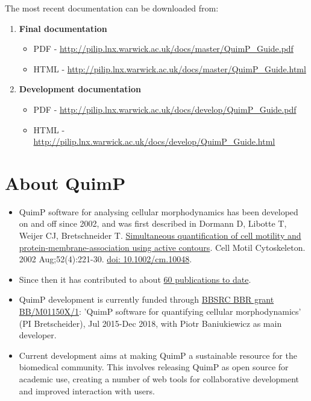 \documentclass[a4paper,12pt]{article}
\begin{document}
The most recent documentation can be downloaded from:
\begin{enumerate}
	\item \textbf{Final documentation}
	\begin{itemize}
		\item PDF - \url{http://pilip.lnx.warwick.ac.uk/docs/master/QuimP_Guide.pdf}
		\item HTML - \url{http://pilip.lnx.warwick.ac.uk/docs/master/QuimP_Guide.html}
	\end{itemize}
	\item \textbf{Development documentation}
	\begin{itemize}
		\item PDF - \url{http://pilip.lnx.warwick.ac.uk/docs/develop/QuimP_Guide.pdf}
		\item HTML - \url{http://pilip.lnx.warwick.ac.uk/docs/develop/QuimP_Guide.html}
	\end{itemize}
\end{enumerate} 

\section{About QuimP}
	\begin{itemize}
	\item QuimP software for analysing cellular morphodynamics has been developed on and off since 2002, and was first described in
Dormann D, Libotte T, Weijer CJ, Bretschneider T. \href{https://www.ncbi.nlm.nih.gov/pubmed/12112136}{Simultaneous quantification of cell motility and protein-membrane-association using active contours}. Cell Motil Cytoskeleton. 2002 Aug;52(4):221-30. \href{http://dx.doi.org/10.1007/978-3-0348-8043-5_17}{doi: 10.1002/cm.10048}.
	\item Since then it has contributed to about \href{http://www.warwick.ac.uk/quimp/quimp-refs}{60 publications to date}.
	\item QuimP development is currently funded through \href{http://www.bbsrc.ac.uk/research/grants-search/AwardDetails/?FundingReference=BB/M01150X/1}{BBSRC BBR grant BB/M01150X/1}: 'QuimP software for quantifying cellular morphodynamics' (PI Bretscheider), Jul 2015-Dec 2018, with Piotr Baniukiewicz as main developer.
	\item Current development aims at making QuimP a sustainable resource for the biomedical community. This involves releasing QuimP as open source for academic use, creating a number of web tools for collaborative development and improved interaction with users.
	\end{itemize}
\end{document}
